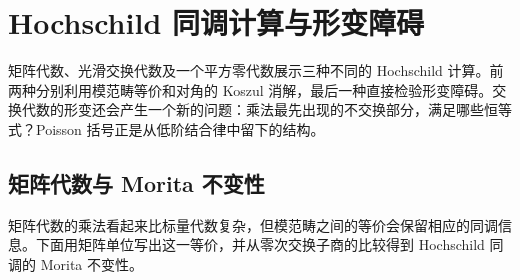 
\section{Hochschild 同调计算与形变障碍}
\label{b4:sec:1204}

矩阵代数、光滑交换代数及一个平方零代数展示三种不同的 Hochschild 计算。前两种分别利用模范畴等价和对角的 Koszul 消解，最后一种直接检验形变障碍。交换代数的形变还会产生一个新的问题：乘法最先出现的不交换部分，满足哪些恒等式？Poisson 括号正是从低阶结合律中留下的结构。

%
%
%
%
%

\subsection{矩阵代数与 Morita 不变性}
\label{b4:subsec:1204:01}

矩阵代数的乘法看起来比标量代数复杂，但模范畴之间的等价会保留相应的同调信息。下面用矩阵单位写出这一等价，并从零次交换子商的比较得到 Hochschild 同调的 Morita 不变性。

